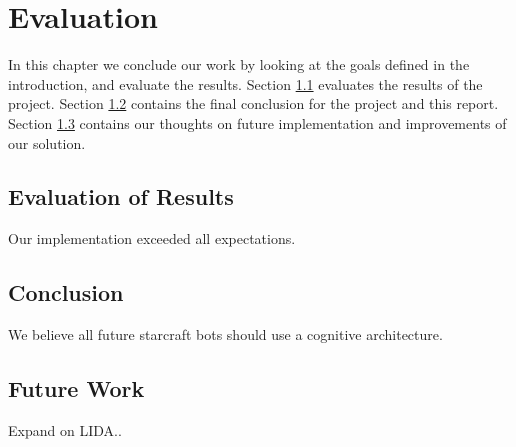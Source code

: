 
\chapter{Evaluation}
In this chapter we conclude our work by looking at the goals defined in the
introduction, and evaluate the results.
Section \ref{sec:evalres} evaluates the results of the project.
Section \ref{sec:conclusion} contains the final conclusion for the project and this report. 
Section \ref{sec:futurework} contains our thoughts on future
implementation and improvements of our solution.



\section{Evaluation of Results}
\label{sec:evalres}
Our implementation exceeded all expectations.

\section{Conclusion}
\label{sec:conclusion}
We believe all future starcraft bots should use a cognitive architecture.

\section{Future Work}
\label{sec:futurework}
Expand on LIDA.\cite{franklin2007lida}.
